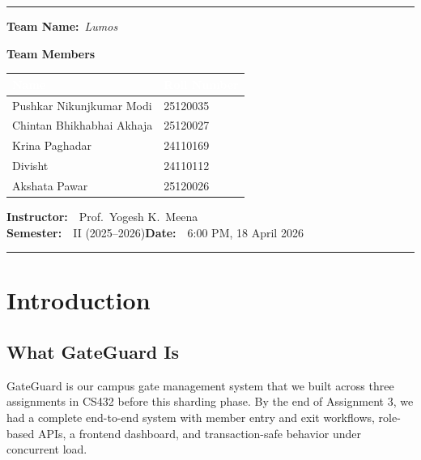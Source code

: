 \documentclass[a4paper,12pt]{article}
\newcommand{\tablehead}[1]{\textcolor{white}{\textbf{#1}}}
\begin{document}
\begin{titlepage}
\begin{center}
\vspace{0.3cm}
\textcolor{iitgngold}{\rule{\textwidth}{1.5pt}}
\vspace{0.2cm}

{\large\textbf{Team Name:}\ \textit{Lumos}}
\vspace{0.4cm}

{\large\textbf{Team Members}}
\vspace{0.4cm}

\begin{tabular}{ll}
\toprule
\rowcolor{tabledeepblue}
\tablehead{Name} & \tablehead{Roll Number} \\
\midrule
Pushkar Nikunjkumar Modi  & 25120035 \\
Chintan Bhikhabhai Akhaja & 25120027 \\
Krina Paghadar            & 24110169 \\
Divisht                   & 24110112 \\
Akshata Pawar             & 25120026 \\
\bottomrule
\end{tabular}

\vspace{0.5cm}
\textbf{Instructor:}\ \ Prof.\ Yogesh K.\ Meena\\[5pt]
\textbf{Semester:}\ \ II (2025--2026)\qquad\textbf{Date:}\ \ 6:00 PM, 18 April 2026\\[5pt]

\vfill
\textcolor{iitgnblue}{\rule{\textwidth}{1pt}}
\end{center}
\end{titlepage}

\newpage
\tableofcontents
\newpage

\section{Introduction}
\label{sec:intro}

\subsection{What GateGuard Is}

GateGuard is our campus gate management system that we built across three assignments in CS432 before this sharding phase. By the end of Assignment 3, we had a complete end-to-end system with member entry and exit workflows, role-based APIs, a frontend dashboard, and transaction-safe behavior under concurrent load.
\end{document}

